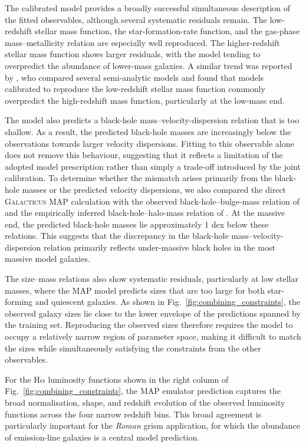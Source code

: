 \documentclass[twocolumn, apj, numberedappendix, iop]{openjournal}
\newcommand{\galacticus}{\textsc{Galacticus}\xspace}
\newcommand{\romanspace}{\textit{Roman}\xspace}
\newcommand{\ha}{H$\alpha$}
\begin{document}
The calibrated model provides a broadly successful simultaneous description
of the fitted observables, although several systematic residuals remain.
The low-redshift stellar mass function, the star-formation-rate function, and
the gas-phase mass--metallicity relation are especially well reproduced.
The higher-redshift stellar mass function shows larger residuals, with the
model tending to overpredict the abundance of lower-mass galaxies.
A similar trend was reported by \citet{2018MNRAS.475.2936K}, who compared
several semi-analytic models and found that models calibrated to reproduce the
low-redshift stellar mass function commonly overpredict the high-redshift mass
function, particularly at the low-mass end.

The model also predicts a black-hole mass--velocity-dispersion relation that
is too shallow. As a result, the predicted black-hole masses are increasingly
below the observations towards larger velocity dispersions. Fitting to this
observable alone does not remove this behaviour, suggesting that it reflects a
limitation of the adopted model prescription rather than simply a trade-off
introduced by the joint calibration. To determine whether the mismatch arises
primarily from the black-hole masses or the predicted velocity dispersions, we
also compared the direct \galacticus{} MAP calculation with the observed
black-hole--bulge-mass relation of \citet{2013ARA&A..51..511K} and the empirically
inferred black-hole--halo-mass relation of \citet{2023MNRAS.518.2123Z}. At the massive end,
the predicted black-hole masses lie approximately 1 dex below these
relations. This suggests that the discrepancy in the
black-hole mass--velocity-dispersion relation primarily reflects under-massive
black holes in the most massive model galaxies.

The size--mass relations also show systematic residuals, particularly at low
stellar masses, where the MAP model predicts sizes that are too large for both
star-forming and quiescent galaxies. As shown in
Fig.~\ref{fig:combining_constraints}, the observed galaxy sizes lie close to
the lower envelope of the predictions spanned by the training set. Reproducing the observed sizes therefore requires the model to occupy a
relatively narrow region of parameter space, making it difficult to match
the sizes while simultaneously satisfying the constraints from the other
observables.

For the \ha{} luminosity functions shown in the right column of Fig.~\ref{fig:combining_constraints}, the MAP emulator prediction captures the
broad normalisation, shape, and redshift evolution of the observed luminosity
functions across the four narrow redshift bins.
This broad agreement is particularly important for the \romanspace{}  grism
application, for which the abundance of emission-line galaxies is a central
model prediction.
\end{document}

